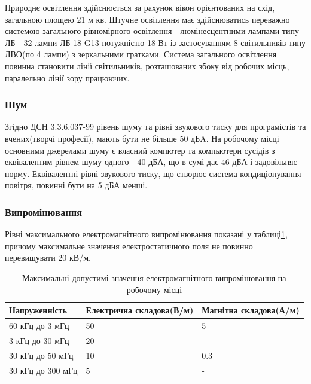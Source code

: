     Природнє освітлення здійснюється за рахунок вікон орієнтованих на схід, загальною площею 21 м кв.
    Штучне освітлення має здійснюватись переважно системою загального рівномірного освітлення -  люмінесцентними лампами типу ЛБ - 32 лампи
    ЛБ-18 G13 потужністю 18 Вт із застосуванням 8 світильників типу ЛВО(по 4 лампи) з зеркальними гратками.
    Система загального освітлення повинна становити лінії світильників, розташованих збоку від робочих місць, паралельно лінії зору працюючих.

    \subsubsection{Шум}
        Згідно ДСН 3.3.6.037-99\cite{lab-dsn37} рівень шуму та рівні звукового тиску для програмістів та вчених(творчі професії), мають бути не більше 50 дБA. 
        На робочому місці основними джерелами шуму є власний компютер та компьютери сусідів з еквівалентим рівнем шуму одного - 40 дБА, що в сумі дає 46 дБА
        і задовільняє норму.
        Еквівалентні рівні звукового тиску, що створює система кондиціонування повітря, повинні бути на 5 дБА менші.
    \subsubsection{Випромінювання}
    Рівні максимального електромагнітного випромінювання показані у таблиці\ref{tab:lab-waves}, причому максимальне значення
    електростатичного поля не повинно перевищувати 20 кВ/м.

    \begin{table}[h]
        \caption{Максимальні допустимі значення електромагнітного випромінювання на робочому місці}
        \begin{tabularx}{\textwidth}{| X | X | X |}
            \hline
            Напруженність & Електрична складова(В/м) & Магнітна складова(А/м) \\ \hline
            60 кГц до 3 мГц     & 50                       & 5                      \\ \hline
            3 кГц до 30 мГц     & 20                       & -                      \\ \hline
            30 кГц до 50 мГц    & 10                       & 0.3                    \\ \hline
            30 кГц до 300 мГц   & 5                        & -                      \\ \hline
        \end{tabularx}
        \label{tab:lab-waves}
    \end{table}

